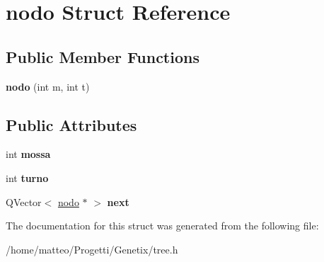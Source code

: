 \hypertarget{structnodo}{}\section{nodo Struct Reference}
\label{structnodo}
\subsection*{Public Member Functions}
\begin{DoxyCompactItemize}
\item 
\mbox{\label{structnodo_a9d1dcaed55d5a62573d160779e702911}} 
{\bfseries nodo} (int m, int t)
\end{DoxyCompactItemize}
\subsection*{Public Attributes}
\begin{DoxyCompactItemize}
\item 
\mbox{\label{structnodo_afe5e9a3e96eac7c82b72117892b83b3d}} 
int {\bfseries mossa}
\item 
\mbox{\label{structnodo_a69055a314553f4c024db32019bac3e88}} 
int {\bfseries turno}
\item 
\mbox{\label{structnodo_af6f1ca1233bca67216c328bc3bbe9a36}} 
Q\+Vector$<$ \hyperlink{structnodo}{nodo} $\ast$ $>$ {\bfseries next}
\end{DoxyCompactItemize}


The documentation for this struct was generated from the following file\+:\begin{DoxyCompactItemize}
\item 
/home/matteo/\+Progetti/\+Genetix/tree.\+h\end{DoxyCompactItemize}
